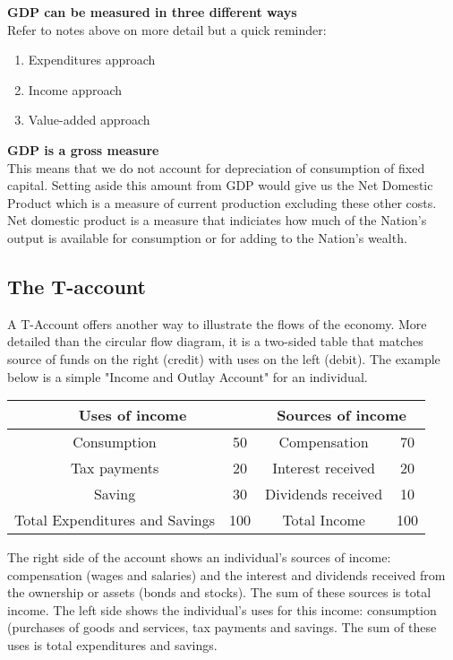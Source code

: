 \documentclass[12pt, letterpaper]{article}
\begin{document}
{\vspace{10pt}
\noindent\textbf{GDP can be measured in three different ways}\\
Refer to notes above on more detail but a quick reminder:
\begin{enumerate}
	\item Expenditures approach
	\item Income approach
	\item Value-added approach
\end{enumerate}

\vspace{10pt}
\noindent\textbf{GDP is a gross measure}\\
This means that we do not account for depreciation of consumption of fixed capital. Setting aside this amount from GDP would give us the Net Domestic Product which is a measure of current production excluding these other costs. Net domestic product is a measure that indiciates how much of the Nation's output is available for consumption or for adding to the Nation's wealth.

\subsection{The T-account}
A T-Account offers another way to illustrate the flows of the economy. More detailed than the circular flow diagram, it is a two-sided table that matches source of funds on the right (credit) with uses on the left (debit). The example below is a simple "Income and Outlay Account" for an individual.

\begin{center}
\begin{tabular}{|c|c|c|c|}

\multicolumn{2}{c}{Uses of income} & \multicolumn{2}{c}{Sources of income}\\
\hline
Consumption & 50 & Compensation & 70\\
Tax payments & 20 & Interest received & 20\\
Saving & 30 & Dividends received & 10\\
\hline
Total Expenditures and Savings & 100 & Total Income & 100\\
\hline

\end{tabular}
\end{center}
The right side of the account shows an individual's sources of income: compensation (wages and salaries) and the interest and dividends received from the ownership or assets (bonds and stocks). The sum of these sources is total income. The left side shows the individual's uses for this income: consumption (purchases of goods and services, tax payments and savings. The sum of these uses is total expenditures and savings.

}
\end{document}
